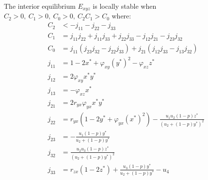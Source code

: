 \begin{theorem}\label{thm:interior-stability}
    The interior equilibrium $E_{xyz}$ is locally stable when $C_2>0,\ C_1>0,\ C_0>0,\ C_2C_1>C_0$ where:
    \begin{align*}
        C_2 &< -j_{11}-j_{22}-j_{33}\\
        C_1 &= j_{11}j_{22}+j_{11}j_{33}+j_{22}j_{33}-j_{12}j_{21}-j_{23}j_{32}\\
        C_0 &= j_{11}\left(j_{23}j_{32}-j_{22}j_{33}\right)+j_{21}\left(j_{12}j_{33}-j_{13}j_{32}\right)\\
        j_{11} &= 1-2x^*+\varphi_{xy}\left(y^*\right)^2-\varphi_{xz}z^*\\
        j_{12} &= 2\varphi_{xy}x^*y^*\\
        j_{13} &= -\varphi_{xz}x^*\\
        j_{21} &= 2r_{yx}\varphi_{yx}x^*y^*\\
        j_{22} &= r_{yx}\left(1-2y^*+\varphi_{yx}\left(x^*\right)^2\right)-\frac{u_1u_2\left(1-p\right)z^*}{\left(u_2+\left(1-p\right)y^*\right)^2}\\
        j_{23} &= -\frac{u_1\left(1-p\right)y^*}{u_2+\left(1-p\right)y^*}\\
        j_{32} &= \frac{u_2u_3\left(1-p\right)z^*}{\left(u_2+\left(1-p\right)y^*\right)^2}\\
        j_{33} &= r_{zx}\left(1-2z^*\right)+\frac{u_3\left(1-p\right)y^*}{u_2+\left(1-p\right)y^*}-u_4
    \end{align*}
\end{theorem}

